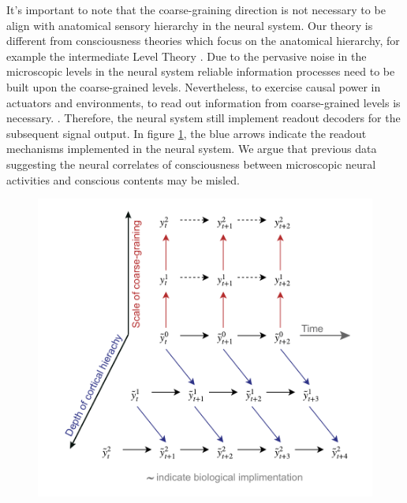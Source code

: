 \documentclass[utf8]{article}
\begin{document}
        It's important to note that the coarse-graining direction is not necessary to be align with  anatomical sensory hierarchy in the neural system. Our theory is different from consciousness theories which focus on the anatomical hierarchy, for example the intermediate Level Theory \citep[see also \ref{IntermediateLevelTheory}]{prinz2007intermediate, jackendoff1987consciousness}. Due to the pervasive noise in the microscopic levels in the neural system reliable information processes need to be built upon the coarse-grained levels. Nevertheless, to exercise causal power in actuators and environments, to read out information from coarse-grained levels is necessary. . Therefore, the neural system still implement readout decoders for the subsequent signal output. In figure \ref{fig:hierarchy}, the blue arrows indicate the readout mechanisms implemented in the neural system. We argue that previous data suggesting the neural correlates of consciousness between microscopic neural activities and conscious contents may be misled. 

        
			\begin{figure}[H]
				\includegraphics[width=\textwidth]{WritingMaterials/Fig_SeperationOfCGandCortHierachy/SeperationOfCGandCortHierachy.pdf}
				\label{fig:hierarchy}
			\end{figure}
\end{document}
